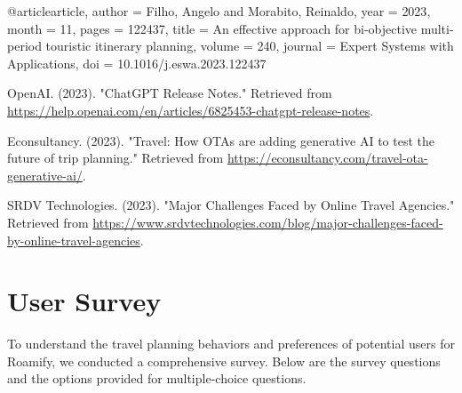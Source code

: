 \documentclass[conference]{IEEEtran}
\begin{document}
\begin{thebibliography}{1}

        @article{article,
        author = {Filho, Angelo and Morabito, Reinaldo},
        year = {2023},
        month = {11},
        pages = {122437},
        title = {An effective approach for bi-objective multi-period touristic itinerary planning},
        volume = {240},
        journal = {Expert Systems with Applications},
        doi = {10.1016/j.eswa.2023.122437}
        }

        OpenAI. (2023). "ChatGPT Release Notes." Retrieved from \url{https://help.openai.com/en/articles/6825453-chatgpt-release-notes}.

        Econsultancy. (2023). "Travel: How OTAs are adding generative AI to test the future of trip planning." Retrieved from \url{https://econsultancy.com/travel-ota-generative-ai/}.

        SRDV Technologies. (2023). "Major Challenges Faced by Online Travel Agencies." Retrieved from \url{https://www.srdvtechnologies.com/blog/major-challenges-faced-by-online-travel-agencies}.

\end{thebibliography}

\newpage

\appendix
\section{User Survey}
To understand the travel planning behaviors and preferences of potential users for Roamify, we conducted a comprehensive survey. Below are the survey questions and the options provided for multiple-choice questions.
\end{document}

